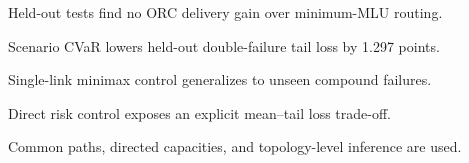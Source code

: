 \begin{highlights}
\item Held-out tests find no ORC delivery gain over minimum-MLU routing.
\item Scenario CVaR lowers held-out double-failure tail loss by 1.297 points.
\item Single-link minimax control generalizes to unseen compound failures.
\item Direct risk control exposes an explicit mean--tail loss trade-off.
\item Common paths, directed capacities, and topology-level inference are used.
\end{highlights}
